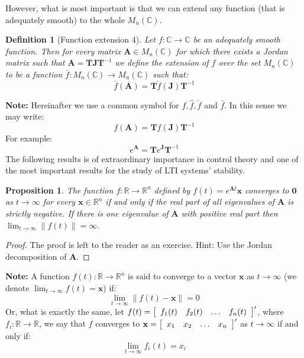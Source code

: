 \documentclass[a4paper,10pt,oneside]{book}
\newtheorem{definition}{Definition}
\newtheorem{proposition}[theorem]{Proposition}
\begin{document}
However, what is most important is that we can extend any function (that is
adequately smooth) to the whole $M_n(\mathbb{C})$.
\begin{definition}[Function extension 4]
 Let $f:\mathbb{C}\to\mathbb{C}$ be an adequately smooth function. Then for every 
 matrix $\mathbf{A}\in M_n(\mathbb{C})$ for which there exists a Jordan matrix such that
 $\mathbf{A}=\mathbf{TJT}^{-1}$ we define the extension of $f$ over the set  $M_n(\mathbb{C})$ to
 be a function $\bar{f}:M_n(\mathbb{C})\to M_n(\mathbb{C})$ such that:
 \begin{equation}
  \bar{f}(\mathbf{A})=\mathbf{T}\breve{f}(\mathbf{J})\mathbf{T}^{-1}
 \end{equation}
\end{definition}
\noindent \textbf{Note:} Hereinafter we use a common symbol for $f,\hat{f},\breve{f}$ and $\bar{f}$. In this sense we may write:
\begin{equation}
  f(\mathbf{A})=\mathbf{T}f(\mathbf{J})\mathbf{T}^{-1}
 \end{equation}
For example:
\begin{equation}
  e^{\mathbf{A}}=\mathbf{T}e^{\mathbf{J}}\mathbf{T}^{-1}
 \end{equation}
The following results is of extraordinary importance in control theory
and one of the most important results for the study of LTI systems' stability.
\begin{proposition}
 The function $f:\mathbb{R}\to \mathbb{R}^n$ defined by $f(t)=e^{\mathbf{A}t}\mathbf{x}$ converges to $\mathbf{0}$
 as $t\to\infty$ for every $\mathbf{x}\in\mathbb{R}^n$ if and only if the real part of all eigenvalues of $\mathbf{A}$
 is strictly negative. If there is one eigenvalue of $\mathbf{A}$ with positive real part then $\lim_{t\to\infty}\|f(t)\|=\infty$.
\end{proposition}
\begin{proof}
 The proof is left to the reader as an exercise. Hint: Use the Jordan decomposition of $\mathbf{A}$.
\end{proof}

\noindent \textbf{Note:} A function $f(t):\mathbb{R}\to \mathbb{R}^n$ is said to converge to a vector $\mathbf{x}$ as $t\to\infty$ (we denote $\lim_{t\to\infty}f(t)=\mathbf{x}$) if:
\begin{equation}
 \lim_{t\to\infty}\|f(t)-\mathbf{x}\|=0
\end{equation}
Or, what is exactly the same, let $f(t)=\left[ {\begin{array}{*{4}c}f_1(t) & f_2(t) & \ldots & f_n(t) \end{array} } \right]'$, where $f_i:\mathbb{R}\to\mathbb{R}$, we say that $f$ converges to $\mathbf{x}=\left[ {\begin{array}{*{4}c}x_1 & x_2 & \ldots & x_n \end{array} } \right]'$ as $t\to\infty$ if and only if:
\begin{equation}
 \lim_{t\to\infty}f_i(t)=x_i
\end{equation}
\end{document}
